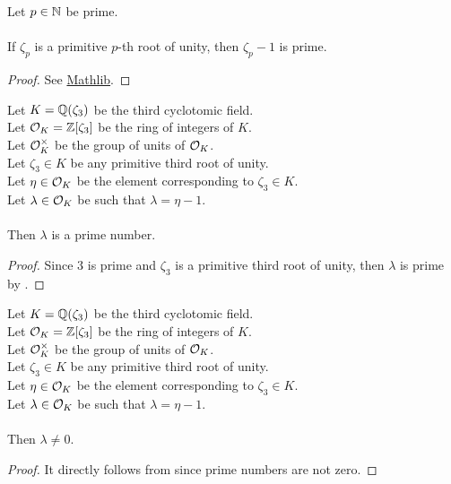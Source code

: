 \begin{theorem}
    \label{thm:zeta_sub_one_prime1}
    \leanok
    Let $p \in \mathbb{N}$ be prime. \\\\
    If $\zeta_p$ is a primitive $p$-th root of unity, then $\zeta_p - 1$ is prime.
\end{theorem}
\begin{proof}
    \leanok
    See \href{https://pitmonticone.github.io/FLT3/docs/FLT3/Mathlib/NumberTheory/Cyclotomic/Rat.html#IsPrimitiveRoot.zeta_sub_one_prime'}{Mathlib}.
\end{proof}

\begin{lemma}
    \label{lmm:lambda_prime}
    \leanok
    Let $K = \mathbb{Q}(\zeta_3)$ be the third cyclotomic field. \\
    Let $\mathcal{O}_K = \mathbb{Z}[\zeta_3]$ be the ring of integers of $K$. \\
    Let $\mathcal{O}^\times_K$ be the group of units of $\mathcal{O}_K$. \\
    Let $\zeta_3 \in K$ be any primitive third root of unity. \\
    Let $\eta \in \mathcal{O}_K$ be the element corresponding to $\zeta_3 \in K$. \\
    Let $\lambda \in \mathcal{O}_K$ be such that $\lambda = \eta -1$. \\\\
    Then $\lambda$ is a prime number.
\end{lemma}
\begin{proof}
    \leanok
    Since $3$ is prime and $\zeta_3$ is a primitive third root of unity, then $\lambda$ is prime
    by .
\end{proof}

\begin{lemma}
    \label{lmm:lambda_ne_zero}
    \leanok
    Let $K = \mathbb{Q}(\zeta_3)$ be the third cyclotomic field. \\
    Let $\mathcal{O}_K = \mathbb{Z}[\zeta_3]$ be the ring of integers of $K$. \\
    Let $\mathcal{O}^\times_K$ be the group of units of $\mathcal{O}_K$. \\
    Let $\zeta_3 \in K$ be any primitive third root of unity. \\
    Let $\eta \in \mathcal{O}_K$ be the element corresponding to $\zeta_3 \in K$. \\
    Let $\lambda \in \mathcal{O}_K$ be such that $\lambda = \eta -1$. \\\\
    Then $\lambda \neq 0$.
\end{lemma}
\begin{proof}
    \leanok
    It directly follows from  since prime numbers are not zero.
\end{proof}

